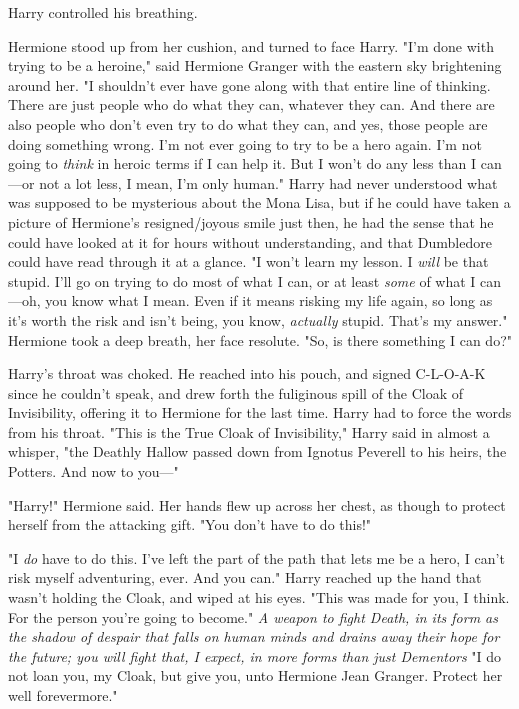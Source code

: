 Harry controlled his breathing.

Hermione stood up from her cushion, and turned to face Harry. "I'm done with
trying to be a heroine," said Hermione Granger with the eastern sky brightening
around her. "I shouldn't ever have gone along with that entire line of
thinking. There are just people who do what they can, whatever they can. And
there are also people who don't even try to do what they can, and yes, those
people are doing something wrong. I'm not ever going to try to be a hero again.
I'm not going to \emph{think} in heroic terms if I can help it. But I won't do
any less than I can---or not a lot less, I mean, I'm only human." Harry had
never understood what was supposed to be mysterious about the Mona Lisa, but if
he could have taken a picture of Hermione's resigned/joyous smile just then, he
had the sense that he could have looked at it for hours without understanding,
and that Dumbledore could have read through it at a glance. "I won't learn my
lesson. I \emph{will} be that stupid. I'll go on trying to do most of what I
can, or at least \emph{some} of what I can---oh, you know what I mean. Even if
it means risking my life again, so long as it's worth the risk and isn't being,
you know, \emph{actually} stupid. That's my answer." Hermione took a deep
breath, her face resolute. "So, is there something I can do?"

Harry's throat was choked. He reached into his pouch, and signed C-L-O-A-K
since he couldn't speak, and drew forth the fuliginous spill of the Cloak of
Invisibility, offering it to Hermione for the last time. Harry had to force the
words from his throat. "This is the True Cloak of Invisibility," Harry said in
almost a whisper, "the Deathly Hallow passed down from Ignotus Peverell to his
heirs, the Potters. And now to you\mbox{---}"

"Harry!" Hermione said. Her hands flew up across her chest, as though to
protect herself from the attacking gift. "You don't have to do this!"

"I \emph{do} have to do this. I've left the part of the path that lets me be a
hero, I can't risk myself adventuring, ever. And you{\el} can." Harry
reached up the hand that wasn't holding the Cloak, and wiped at his eyes. "This
was made for you, I think. For the person you're going to become." \emph{A
weapon to fight Death, in its form as the shadow of despair that falls on human
minds and drains away their hope for the future; you will fight that, I expect,
in more forms than just Dementors{\el}} "I do not loan you, my Cloak, but
give you, unto Hermione Jean Granger. Protect her well forevermore."

